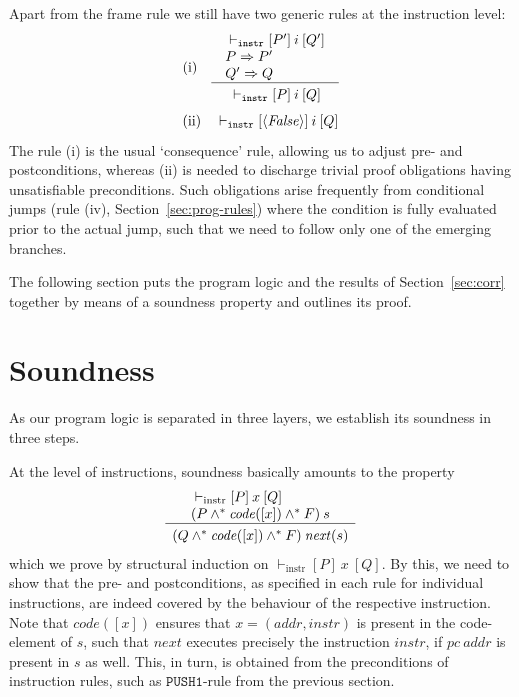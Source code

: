\documentclass[sigplan,10pt,review]{acmart}\settopmatter{printfolios=true,printccs=false,printacmref=false}
\newcommand{\subpred}{\Rightarrow}
\newcommand{\sconj}{\wedge^*}
\newcommand{\ttrip}[5]{\mathit{#1} \vdash_{\mathrm{#2}}[#3]\:#4\:[#5]}
\newcommand{\xnext}{\mathit{next}}
\newcommand{\code}[1]{\mathit{code}(#1)}
\newcommand{\pc}{\mathit{pc}}
\newcommand{\instr}[1]{\mathtt{#1}}
\newcommand{\pure}[1]{\langle#1\rangle}
\newcommand{\RuleC}[2]{\begin{array}{c}#1\\\hline\noalign{\smallskip}#2\end{array}}
\begin{document}
Apart from the frame rule we still have two generic rules at the instruction level:
\[
\begin{array}{l l}
\mbox{(i)} & \RuleC{\begin{array}{l}
                     \ttrip{}{\mathtt{instr}}{P'}{i}{Q'} \\
                     P \subpred P' \\ 
                     Q' \subpred Q
                     \end{array}}{\ttrip{}{\mathtt{instr}}{P}{i}{Q}}
\end{array}
\]
\[
\begin{array}{l l}
\mbox{(ii)} & \ttrip{}{\mathtt{instr}}{\pure{\mathit{False}}}{i}{Q} 
\end{array}
\]
The rule (i) is the usual `consequence' rule, allowing us to adjust pre- and
postconditions, whereas (ii) is needed to discharge trivial 
proof obligations having unsatisfiable preconditions. Such obligations 
arise frequently from conditional jumps (rule (iv), Section~\ref{sec:prog-rules})
where the condition is fully evaluated prior to the actual jump, such that
we need to follow only one of the emerging branches.

The following section puts the program logic and the results of Section~\ref{sec:corr}
together by means of a soundness property and outlines its proof. 
%
\section{Soundness}
\label{sec:sound}
As our program logic is separated in three layers, we establish its soundness in three steps.

At the level of instructions, soundness basically amounts to the property
\begin{equation}
\label{prop:sound-instr}
\RuleC{\begin{array}{l}
         \ttrip{}{instr}{P}{x}{Q} \\
         (P \sconj \code{[x]} \sconj F)\: s
       \end{array}}
 {(Q \sconj \code{[x]} \sconj F)\: \xnext(s)}
\end{equation}
which we prove by structural induction on $\ttrip{}{instr}{P}{x}{Q}$. 
By this, we need to show that the pre- and postconditions, as specified in each 
rule for individual instructions, are indeed covered by the behaviour of 
the respective instruction. Note that $\code{[x]}$ ensures that 
$x = (\mathit{addr}, \mathit{instr})$ is present in the code-element of $s$, such that
$\xnext$ executes precisely the instruction $\mathit{instr}$, if $\pc\:\mathit{addr}$ is present in $s$ as well.
This, in turn, is obtained from the preconditions of instruction
rules, such as $\instr{PUSH1}$-rule from the previous section.
\end{document}
